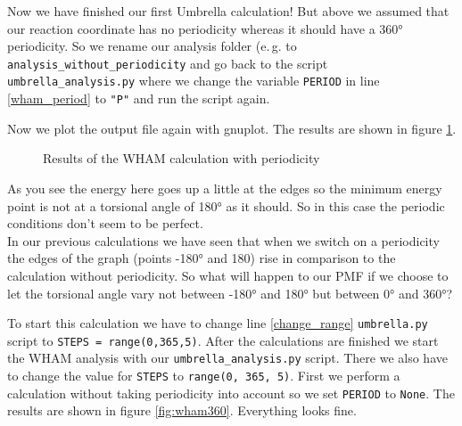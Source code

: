 \documentclass[a4paper,11pt]{scrartcl}
\begin{document}
Now we have finished our first Umbrella calculation! But above we assumed that our reaction coordinate has no periodicity whereas it should have a 360° periodicity. So we rename our analysis folder (e.\,g. to \texttt{analysis\_without\_periodicity} and go back to the script \texttt{umbrella\_analysis.py} where we change the variable \texttt{PERIOD} in line \ref{wham_period} to \texttt{"P"} and run the script again.

Now we plot the output file again with gnuplot. The results are shown in figure \ref{fig:wham_result_period}.

\begin{figure} [htb]
	\caption{Results of the WHAM calculation with periodicity}
	\label{fig:wham_result_period}
\end{figure} 

As you see the energy here goes up a little at the edges so the minimum energy point is not at a torsional angle of 180° as it should. So in this case the periodic conditions don't seem to be perfect.
\\

In our previous calculations we have seen that when we switch on a periodicity the edges of the graph (points -180° and 180) rise in comparison to the calculation without periodicity. So what will happen to our PMF if we choose to let the torsional angle vary not between -180° and 180° but between 0° and 360°?

To start this calculation we have to change line \ref{change_range} \texttt{umbrella.py} script to \texttt{STEPS = range(0,365,5)}. After the calculations are finished we start the WHAM analysis with our \texttt{umbrella\_analysis.py} script. There we also have to change the value for \texttt{STEPS} to \texttt{range(0, 365, 5)}. First we perform a calculation without taking periodicity into account so we set \texttt{PERIOD} to \texttt{None}. The results are shown in figure \ref{fig:wham360}. Everything looks fine.
\end{document}

